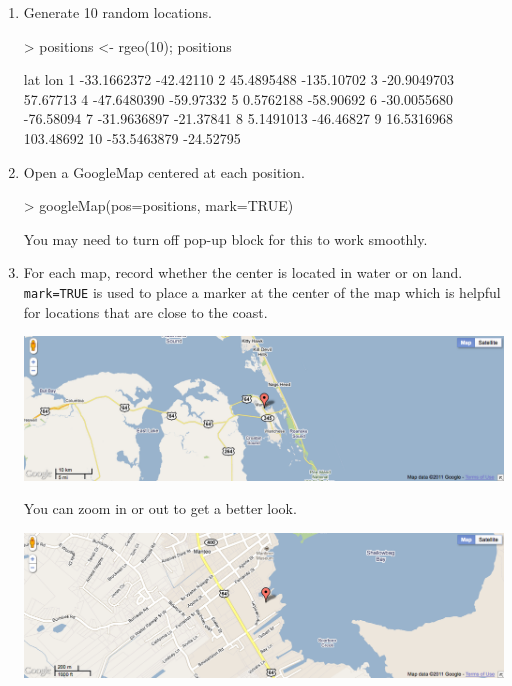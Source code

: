 \begin{enumerate}
\item Generate 10 random locations.

\begin{Schunk}
\begin{Sinput}
> positions <- rgeo(10); positions
\end{Sinput}
\begin{Soutput}
           lat        lon
1  -33.1662372  -42.42110
2   45.4895488 -135.10702
3  -20.9049703   57.67713
4  -47.6480390  -59.97332
5    0.5762188  -58.90692
6  -30.0055680  -76.58094
7  -31.9636897  -21.37841
8    5.1491013  -46.46827
9   16.5316968  103.48692
10 -53.5463879  -24.52795
\end{Soutput}
\end{Schunk}

\item
Open a GoogleMap centered at each position.

\begin{Schunk}
\begin{Sinput}
> googleMap(pos=positions, mark=TRUE)
\end{Sinput}
\end{Schunk}
You may need to turn off pop-up block for this to work smoothly.

\item
For each map, record whether the center is located in water or on land.  \verb!mark=TRUE!
is used to place a marker at the center of the map which is helpful for locations that are close to 
the coast.  
\begin{center}
\includegraphics[width=.8\textwidth]{images/google-water1}
\end{center}
You can zoom in or out to get a better look.
\begin{center}
\includegraphics[width=.8\textwidth]{images/google-water2}
\end{center}



\end{enumerate}
